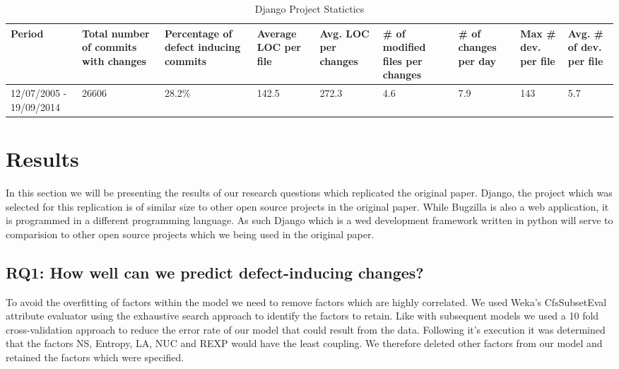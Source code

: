 \documentclass[10pt, conference]{IEEEtran}
\begin{document}
\begin{table*}[t]
	\caption{Django Project Statictics}
	\begin{tabular}{|p{2 cm}|p{1.5 cm}|p{1.5 cm}|p{1.5 cm}|p{1.5 cm}|p{1.5 cm}|p{1.5 cm}|p{1.5 cm}|p{1.5 cm}|}
		\hline 
		Period  & Total number of commits with changes  & Percentage of defect inducing commits  & Average LOC per file  & Avg. LOC per changes  & \# of modified files per changes  & \# of changes per day  & Max \# dev. per file  & Avg. \# of dev. per file \tabularnewline
		\hline 
		12/07/2005 - 19/09/2014  & 26606  & 28.2\% & 142.5 & 272.3 & 4.6 & 7.9 & 143 & 5.7 \\ \hline 
	\end{tabular}
	\label{table:statistics}	
\end{table*}


\section{Results}
\label{sec:results}

In this section we will be presenting the results of our research questions which replicated the original paper. Django, the project which was selected for this replication is of similar size to other open source projects in the original paper. While Bugzilla is also a web application, it is programmed in a different programming language. As such Django which is a wed development framework written in python will serve to comparision to other open source projects which we being used in the original paper.


\subsection{RQ1: How well can we predict defect-inducing changes?}
\label{sec:rq1}


To avoid the overfitting of factors within the model we need to remove factors which are highly correlated. We used Weka's CfsSubsetEval attribute evaluator using the exhaustive search approach to identify the factors to retain. Like with subsequent models we used a 10 fold cross-validation approach to reduce the error rate of our model that could result from the data. Following it's execution it was determined that the factors NS, Entropy, LA, NUC and REXP would have the least coupling. We therefore deleted other factors from our model and retained the factors which were specified.
\end{document}
